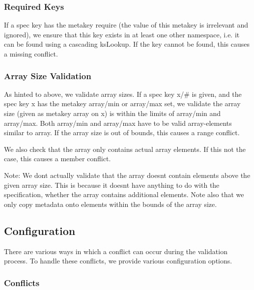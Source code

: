 \subsubsection*{Required Keys}

If a spec key has the metakey {\ttfamily require} (the value of this metakey is irrelevant and ignored), we ensure that this key exists in at least one other namespace, i.\+e. it can be found using a cascading {\ttfamily ks\+Lookup}. If the key cannot be found, this causes a {\ttfamily missing} conflict.

\subsubsection*{Array Size Validation}

As hinted to above, we validate array sizes. If a spec key {\ttfamily x/\#} is given, and the spec key {\ttfamily x} has the metakey {\ttfamily array/min} or {\ttfamily array/max} set, we validate the array size (given as metakey {\ttfamily array} on {\ttfamily x}) is within the limits of {\ttfamily array/min} and {\ttfamily array/max}. Both {\ttfamily array/min} and {\ttfamily array/max} have to be valid array-\/elements similar to {\ttfamily array}. If the array size is out of bounds, this causes a {\ttfamily range} conflict.

We also check that the array only contains actual array elements. If this not the case, this causes a {\ttfamily member} conflict.

Note\+: We don\textquotesingle{}t actually validate that the array doesn\textquotesingle{}t contain elements above the given array size. This is because it doesn\textquotesingle{}t have anything to do with the specification, whether the array contains additional elements. Note also that we only copy metadata onto elements within the bounds of the array size.

\subsection*{Configuration}

There are various ways in which a conflict can occur during the validation process. To handle these conflicts, we provide various configuration options.

\subsubsection*{Conflicts}

